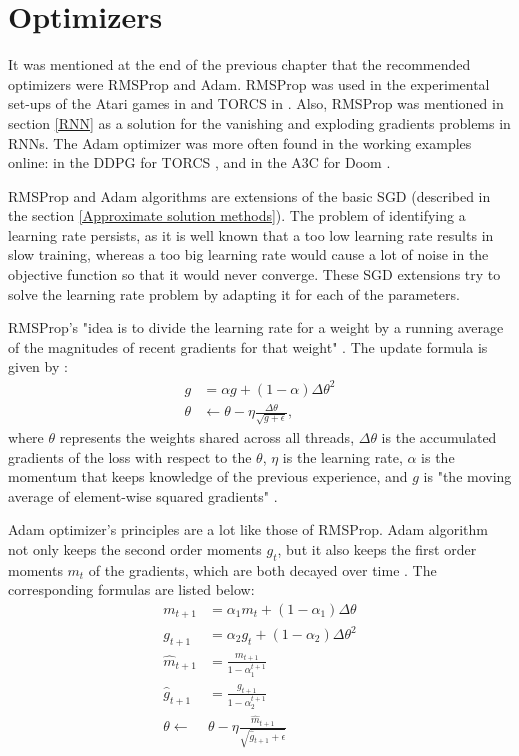 \section{Optimizers}\label{Optimizers}
It was mentioned at the end of the previous chapter that the recommended optimizers were RMSProp and Adam. RMSProp was used in the experimental set-ups of the Atari games in \cite{DBLP:journals/corr/MnihKSGAWR13} and TORCS in \cite{DBLP:journals/corr/MnihBMGLHSK16}. Also, RMSProp was mentioned in section \ref{RNN} as a solution for the vanishing and exploding gradients problems in RNNs. The Adam optimizer was more often found in the working examples online: in the DDPG for TORCS \cite{DDPG_Torcs}, and in the A3C for Doom \cite{A3CDoom}.

RMSProp and Adam algorithms are extensions of the basic SGD (described in the section \ref{Approximate solution methods}). The problem of identifying a learning rate persists, as it is well known that a too low learning rate results in slow training, whereas a too big learning rate would cause a lot of noise in the objective function so that it would never converge. These SGD extensions try to solve the learning rate problem by adapting it for each of the parameters. 

RMSProp's "idea is to divide the learning rate for a weight by a running average of the magnitudes of recent gradients for that weight" \cite{RMSProp}. The update formula is given by \cite{DBLP:journals/corr/MnihBMGLHSK16}:
\begin{equation}\label{RMSPropUpdate}
\begin{aligned}
g&=\alpha g + (1-\alpha)\Delta \theta^2\\
\theta & \leftarrow \theta - \eta  \frac{\Delta \theta}{\sqrt{g+\epsilon}},
\end{aligned}
\end{equation}
where $\theta$ represents the weights shared across all threads, $\Delta \theta$ is the accumulated gradients of the loss with respect to the $\theta$, $\eta$ is the learning rate, $\alpha$ is the momentum that keeps knowledge of the previous experience, and $g$ is "the moving average of element-wise squared gradients" \cite{DBLP:journals/corr/MnihBMGLHSK16}.

Adam optimizer's principles are a lot like those of RMSProp. Adam algorithm not only keeps the second order moments $g_{t}$, but it also keeps the first order moments $m_{t}$ of the gradients, which are both decayed over time \cite{Optimizers}. The corresponding formulas are listed below:
\begin{equation}\label{Adam}
\begin{aligned}
m_{t+1}&=\alpha_{1} m_{t} + (1-\alpha_{1})\Delta \theta\\
g_{t+1}&=\alpha_{2} g_{t} + (1-\alpha_{2})\Delta \theta^2\\
\hat{m}_{t+1}&=\frac{m_{t+1}}{1-\alpha_{1}^{t+1}}  \\
\hat{g}_{t+1}&=\frac{g_{t+1}}{1-\alpha_{2}^{t+1}}  \\
\theta \leftarrow & \theta - \eta  \frac{\hat{m}_{t+1}}{\sqrt{\hat{g}_{t+1}+\epsilon}}
\end{aligned}
\end{equation}

